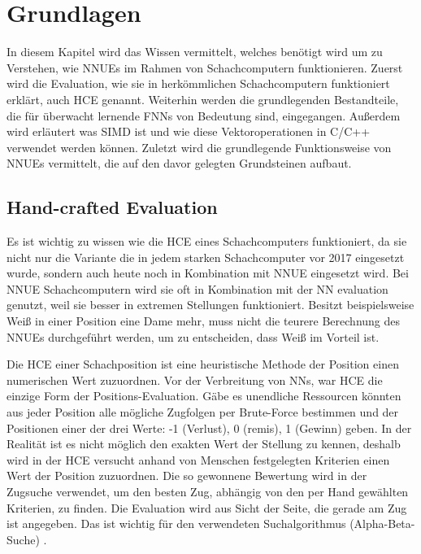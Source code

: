 \chapter{Grundlagen}

In diesem Kapitel wird das Wissen vermittelt, welches benötigt wird um zu Verstehen, wie \acp{NNUE} im Rahmen von Schachcomputern funktionieren. Zuerst wird die Evaluation, wie sie in herkömmlichen Schachcomputern funktioniert erklärt, auch \ac{HCE} genannt. Weiterhin werden die grundlegenden Bestandteile, die für überwacht lernende \acp{FNN} von Bedeutung sind, eingegangen. Außerdem wird erläutert was \ac{SIMD} ist und wie diese Vektoroperationen in C/C++ verwendet werden können. Zuletzt wird die grundlegende Funktionsweise von \acp{NNUE} vermittelt, die auf den davor gelegten Grundsteinen aufbaut.

\section{Hand-crafted Evaluation}
\label{chap:HCE}

Es ist wichtig zu wissen wie die \ac{HCE} eines Schachcomputers funktioniert, da sie nicht nur die Variante die in jedem starken Schachcomputer vor 2017 eingesetzt wurde, sondern auch heute noch in Kombination mit \ac{NNUE} eingesetzt wird. Bei \ac{NNUE} Schachcomputern wird sie oft in Kombination mit der \ac{NN} evaluation genutzt, weil sie besser in extremen Stellungen funktioniert. Besitzt beispielsweise Weiß in einer Position eine Dame mehr, muss nicht die teurere Berechnung des \acp{NNUE} durchgeführt werden, um zu entscheiden, dass Weiß im Vorteil ist.

Die \ac{HCE} einer Schachposition ist eine heuristische Methode der Position einen numerischen Wert zuzuordnen. Vor der Verbreitung von \acp{NN}, war \ac{HCE} die einzige Form der Positions-Evaluation. Gäbe es unendliche Ressourcen könnten aus jeder Position alle mögliche Zugfolgen per Brute-Force bestimmen und der Positionen einer der drei Werte: -1 (Verlust), 0 (remis), 1 (Gewinn) geben. In der Realität ist es nicht möglich den exakten Wert der Stellung zu kennen, deshalb wird in der \ac{HCE} versucht anhand von Menschen festgelegten Kriterien einen Wert der Position zuzuordnen. Die so gewonnene Bewertung wird in der Zugsuche verwendet, um den besten Zug, abhängig von den per Hand gewählten Kriterien, zu finden. Die Evaluation wird aus Sicht der Seite, die gerade am Zug ist angegeben. Das ist wichtig für den verwendeten Suchalgorithmus (Alpha-Beta-Suche) \cite{Slagle1969}.

